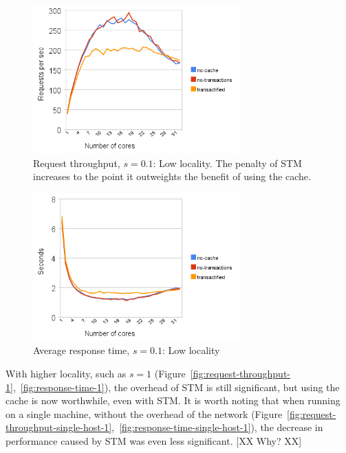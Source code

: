 \documentclass[preprint,11pt]{sigplanconf}
\begin{document}
\begin{figure}
 \begin{center}
  \includegraphics[width=8cm]{transaction-rate-client-server-0dot1.png}
 \end{center}
 \caption{Request throughput, $s = 0.1$: Low locality.
          The penalty of STM increases to the point it outweights the benefit of
          using the cache.} 
 \label{fig:request-throughput-0.1}
\end{figure}
\begin{figure}
 \begin{center}
  \includegraphics[width=8cm]{response-time-client-server-0dot1.png}
 \end{center}
 \caption{Average response time, $s = 0.1$: Low locality}
 \label{fig:response-time-0.1}
\end{figure}

With higher locality, such as $s=1$
(Figure~\ref{fig:request-throughput-1},~\ref{fig:response-time-1}), the overhead
of STM is still significant, but using the cache is now worthwhile, even with
STM. It is worth noting that when running on a single machine, without the
overhead of the network
(Figure~\ref{fig:request-throughput-single-host-1},~\ref{fig:response-time-single-host-1}),
the decrease in performance caused by STM was even less significant. [XX Why?
XX]
\end{document}

